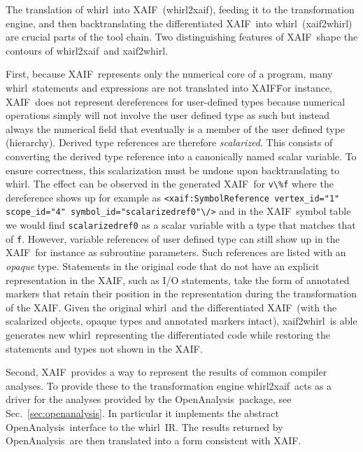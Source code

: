 \documentclass{book}
\newcommand{\OpenAnalysis}{OpenAnalysis}
\newcommand{\xaif}{XAIF}
\newcommand{\whirl}{whirl}
\newcommand{\whirlToxaif}{whirl2xaif}
\newcommand{\xaifTowhirl}{xaif2whirl}
\newcommand{\refsec}[1]{{Sec.~\ref{#1}}}
\begin{document}
The translation of \whirl\ into
\xaif\ (\whirlToxaif), feeding it to the transformation engine, and
then backtranslating the differentiated \xaif\ into \whirl\
(\xaifTowhirl) are crucial parts of the tool chain.  
Two distinguishing features of \xaif\ shape the
contours of \whirlToxaif\ and \xaifTowhirl.  

First, because \xaif\
represents only the numerical core of a program, many \whirl\
statements and expressions are not translated into \xaif\.  For
instance, \xaif\ does not represent dereferences for user-defined types 
because numerical operations simply will not involve the user defined 
type as such but instead always the numerical field that eventually is a member 
of the user defined type (hierarchy). 
Derived type references are therefore {\em scalarized}. This consists of converting
the derived type reference into a canonically named scalar variable.
To ensure correctness, this scalarization must be undone upon backtranslating 
to \whirl. The effect can be observed in the generated \xaif\ for \lstinline{v\%f} where 
the dereference 
shows up for example 
as \lstinline{<xaif:SymbolReference vertex_id="1" scope_id="4" symbol_id="scalarizedref0"\/>}
and in the \xaif\ symbol table we would find \lstinline{scalarizedref0} as a scalar variable with 
a type that matches that of \lstinline{f}. 
However, variable references of user defined type can still show up in the \xaif\ for 
instance as subroutine parameters. Such references are listed with an 
{\em opaque} type. Statements in the original code that do not have an 
explicit representation in the  \xaif, 
such as I/O statements, take the form of annotated markers that retain 
their position in the representation during the transformation of the \xaif.  
Given the original
\whirl\ and the differentiated \xaif\ (with the scalarized objects, opaque types
and annotated markers intact), \xaifTowhirl\ is able generates new \whirl\ representing the
differentiated code while restoring the statements and types not shown in the \xaif.   

Second, \xaif\ provides a way to represent the results of  common
compiler analyses.  To provide these to the transformation engine 
\whirlToxaif\ acts as a driver for the analyses provided by the 
\OpenAnalysis\ package, see \refsec{sec:openanalysis}.
In particular it implements the abstract \OpenAnalysis\ interface
to the \whirl\ IR. The results returned by \OpenAnalysis\ are then 
translated into a form consistent with \xaif.
\end{document}
